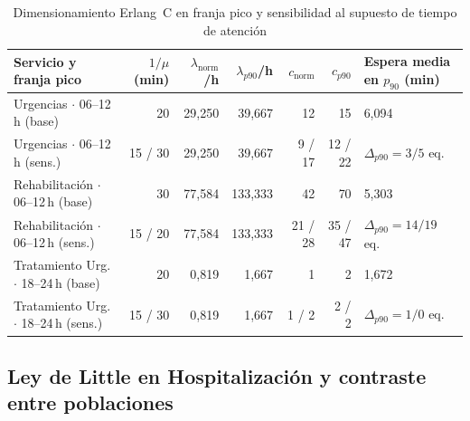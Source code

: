 \begin{table}[t]
\caption{Dimensionamiento Erlang~C en franja pico y sensibilidad al supuesto de tiempo de atención}
\label{tab:erlang_sensibilidad}
\centering
\footnotesize
\begin{tabularx}{\textwidth}{@{}Y r r r r r L{0.18\textwidth}@{}}
\toprule
Servicio y franja pico & $1/\mu$ (min) & $\lambda_{\text{norm}}$/h & $\lambda_{p90}$/h & $c_{\text{norm}}$ & $c_{p90}$ & Espera media en $p_{90}$ (min) \\
\midrule
Urgencias $\cdot$ 06--12\,h (base) & 20 & 29,250 & 39,667 & 12 & 15 & 6,094 \\
Urgencias $\cdot$ 06--12\,h (sens.) & 15 / 30 & 29,250 & 39,667 & 9 / 17 & 12 / 22 & $\Delta_{p90} = 3 / 5$ eq. \\
Rehabilitación $\cdot$ 06--12\,h (base) & 30 & 77,584 & 133,333 & 42 & 70 & 5,303 \\
Rehabilitación $\cdot$ 06--12\,h (sens.) & 15 / 20 & 77,584 & 133,333 & 21 / 28 & 35 / 47 & $\Delta_{p90} = 14 / 19$ eq. \\
Tratamiento Urg. $\cdot$ 18--24\,h (base) & 20 & 0,819 & 1,667 & 1 & 2 & 1,672 \\
Tratamiento Urg. $\cdot$ 18--24\,h (sens.) & 15 / 30 & 0,819 & 1,667 & 1 / 2 & 2 / 2 & $\Delta_{p90} = 1 / 0$ eq. \\
\bottomrule
\end{tabularx}
\end{table}

\subsection{Ley de Little en Hospitalización y contraste entre poblaciones}


